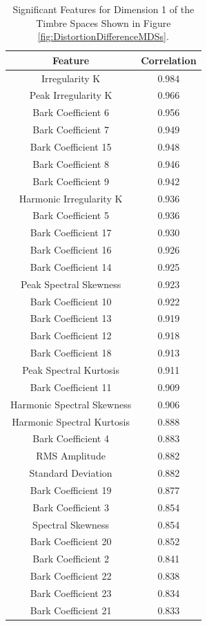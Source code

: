 		\begin{table}[h!]
			\centering
			\begin{tabular}{|c|c|}
				\hline
				\bf{Feature} & \bf{Correlation} \\
				\hline
				\hline
				Irregularity K & 0.984 \\
				\hline
				Peak Irregularity K & 0.966 \\
				\hline
				Bark Coefficient 6 & 0.956 \\
				\hline
				Bark Coefficient 7 & 0.949 \\
				\hline
				Bark Coefficient 15 & 0.948 \\
				\hline
				Bark Coefficient 8 & 0.946 \\
				\hline
				Bark Coefficient 9 & 0.942 \\
				\hline
				Harmonic Irregularity K & 0.936 \\
				\hline
				Bark Coefficient 5 & 0.936 \\
				\hline
				Bark Coefficient 17 & 0.930 \\
				\hline
				Bark Coefficient 16 & 0.926 \\
				\hline
				Bark Coefficient 14 & 0.925 \\
				\hline
				Peak Spectral Skewness & 0.923 \\
				\hline
				Bark Coefficient 10 & 0.922 \\
				\hline
				Bark Coefficient 13 & 0.919 \\
				\hline
				Bark Coefficient 12 & 0.918 \\
				\hline
				Bark Coefficient 18 & 0.913 \\
				\hline
				Peak Spectral Kurtosis & 0.911 \\
				\hline
				Bark Coefficient 11 & 0.909 \\
				\hline
				Harmonic Spectral Skewness & 0.906 \\
				\hline
				Harmonic Spectral Kurtosis & 0.888 \\
				\hline
				Bark Coefficient 4 & 0.883 \\
				\hline
				RMS Amplitude & 0.882 \\
				\hline
				Standard Deviation & 0.882 \\
				\hline
				Bark Coefficient 19 & 0.877 \\
				\hline
				Bark Coefficient 3 & 0.854 \\
				\hline
				Spectral Skewness & 0.854 \\
				\hline
				Bark Coefficient 20 & 0.852 \\
				\hline
				Bark Coefficient 2 & 0.841 \\
				\hline
				Bark Coefficient 22 & 0.838 \\
				\hline
				Bark Coefficient 23 & 0.834 \\
				\hline
				Bark Coefficient 21 & 0.833 \\
				\hline
			\end{tabular}
			\caption{Significant Features for Dimension 1 of the Timbre Spaces Shown in Figure 
				 \ref{fig:DistortionDifferenceMDSs}.}
			\label{tab:DistortionDifferenceFeaturesDim1}
		\end{table}


